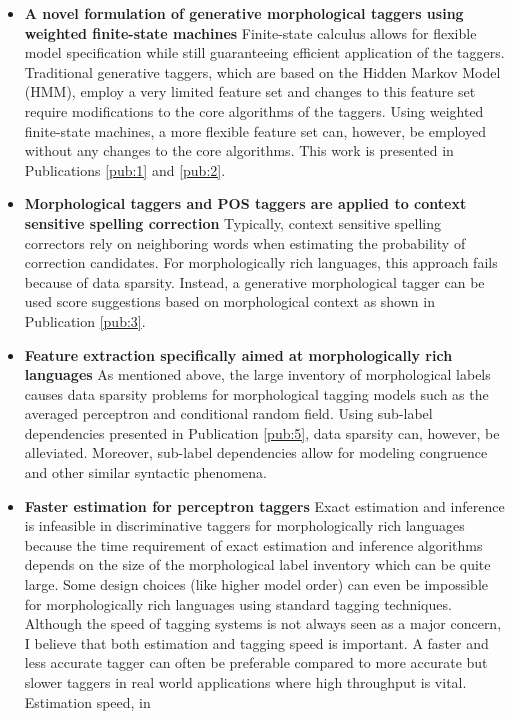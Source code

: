 \begin{itemize}
\item {\bf A novel formulation of generative morphological taggers
    using weighted finite-state machines} Finite-state calculus allows
  for flexible model specification while still guaranteeing efficient
  application of the taggers. Traditional generative taggers, which
  are based on the Hidden Markov Model (HMM), employ a very limited
  feature set and changes to this feature set require modifications to
  the core algorithms of the taggers. Using weighted finite-state
  machines, a more flexible feature set can, however, be employed
  without any changes to the core algorithms. This work is presented
  in Publications \ref{pub:1} and \ref{pub:2}.
\item {\bf Morphological taggers and POS taggers are applied to context
  sensitive spelling correction} Typically, context sensitive spelling
  correctors rely on neighboring words when estimating the probability
  of correction candidates. For morphologically rich languages, this
  approach fails because of data sparsity. Instead, a generative
  morphological tagger can be used score suggestions based on
  morphological context as shown in Publication \ref{pub:3}.
\item {\bf Feature extraction specifically aimed at morphologically
    rich languages} As mentioned above, the large inventory of
  morphological labels causes data sparsity problems for morphological
  tagging models such as the averaged perceptron and conditional
  random field. Using sub-label dependencies presented in Publication \ref{pub:5},
  data sparsity can, however, be alleviated. Moreover, sub-label
  dependencies allow for modeling congruence and other similar
  syntactic phenomena.
\item {\bf Faster estimation for perceptron taggers} Exact estimation
  and inference is infeasible in discriminative taggers for
  morphologically rich languages because the time requirement of exact
  estimation and inference algorithms depends on the size of the
  morphological label inventory which can be quite large. Some design
  choices (like higher model order) can even be impossible for
  morphologically rich languages using standard tagging
  techniques. Although the speed of tagging systems is not always seen
  as a major concern, I believe that both estimation and tagging speed
  is important. A faster and less accurate tagger can often be
  preferable compared to more accurate but slower taggers in real world
  applications where high throughput is vital. Estimation speed, in

\end{itemize}
